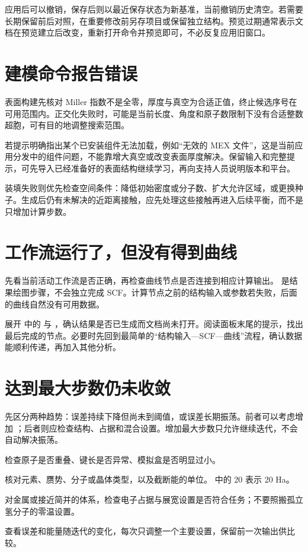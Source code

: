 应用后可以撤销，保存后则以最近保存状态为新基准，当前撤销历史清空。若需要长期保留前后对照，在重要修改前另存项目或保留独立结构。预览过期通常表示文档在预览建立后改变，重新打开命令并预览即可，不必反复应用旧窗口。

\section{建模命令报告错误}

表面构建先核对 Miller 指数不是全零，厚度与真空为合适正值，终止候选序号在可用范围内。正交化失败时，可能是当前长度、角度和原子数限制下没有合适整数超胞，可有目的地调整搜索范围。

若提示明确指出某个已安装组件无法加载，例如“无效的 MEX 文件”，这是当前应用分发中的组件问题，不能靠增大真空或改变表面厚度解决。保留输入和完整提示，可先导入已经准备好的表面结构继续学习，再向支持人员说明版本和平台。

装填失败则优先检查空间条件：降低初始密度或分子数、扩大允许区域，或更换种子。生成后仍有未解决的近距离接触，应先处理这些接触再进入后续平衡，而不是只增加计算步数。

\section{工作流运行了，但没有得到曲线}

先看当前活动工作流是否正确，再检查曲线节点是否连接到相应计算输出。 是结果绘图步骤，不会独立完成 SCF。计算节点之前的结构输入或参数若失败，后面的曲线自然没有可用数据。

展开  中的  与 ，确认结果是否已生成而文档尚未打开。阅读面板末尾的提示，找出最后完成的节点。必要时先回到最简单的“结构输入—SCF—曲线”流程，确认数据能顺利传递，再加入其他分析。

\section{ 达到最大步数仍未收敛}

先区分两种趋势：误差持续下降但尚未到阈值，或误差长期振荡。前者可以考虑增加 ；后者则应检查结构、占据和混合设置。增加最大步数只允许继续迭代，不会自动解决振荡。

\begin{steps}
\item 检查原子是否重叠、键长是否异常、模拟盒是否明显过小。
\item 核对元素、赝势、分子或晶体类型，以及截断能的单位。 中的 20 表示 20 Ha。
\item 对金属或接近简并的体系，检查电子占据与展宽设置是否符合任务；不要照搬孤立氢分子的零温设置。
\item 查看误差和能量随迭代的变化，每次只调整一个主要设置，保留前一次输出供比较。
\end{steps}

